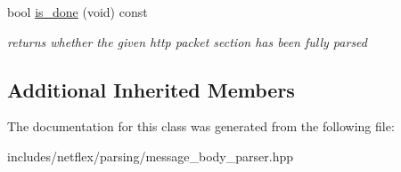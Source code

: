 \begin{DoxyCompactItemize}
\mbox{\label{classnetflex_1_1parsing_1_1message__body__parser_a71557821eaea2a6b629f86165fbc2f52}} 
bool \hyperlink{classnetflex_1_1parsing_1_1message__body__parser_a71557821eaea2a6b629f86165fbc2f52}{is\+\_\+done} (void) const
\begin{DoxyCompactList}\small\item\em returns whether the given http packet section has been fully parsed \end{DoxyCompactList}\end{DoxyCompactItemize}
\subsection*{Additional Inherited Members}


The documentation for this class was generated from the following file\+:\begin{DoxyCompactItemize}
\item 
includes/netflex/parsing/message\+\_\+body\+\_\+parser.\+hpp\end{DoxyCompactItemize}
